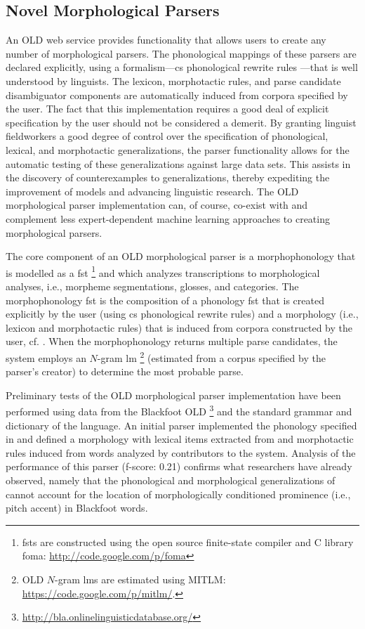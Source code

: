 \documentclass[11pt]{article}
\begin{document}
\subsection{Novel Morphological Parsers}
\label{sec:old-parsers}


An OLD web service provides functionality that allows users to create any
number of morphological parsers. The phonological mappings of these parsers
are declared explicitly, using a formalism---\gls{cs} phonological rewrite
rules \cite{chomsky68}---that is well understood by linguists. The lexicon,
morphotactic rules, and parse candidate disambiguator components are
automatically induced from corpora specified by the user. The fact that this
implementation requires a good deal of explicit specification by the user
should not be considered a demerit. By granting linguist fieldworkers a good
degree of control over the specification of phonological, lexical, and
morphotactic generalizations, the parser functionality allows for the automatic
testing of these generalizations against large data sets. This assists
in the discovery of counterexamples to generalizations, thereby expediting
the improvement of models and advancing linguistic research. The OLD
morphological parser implementation can, of course, co-exist with and
complement less expert-dependent machine learning approaches to creating
morphological parsers.

The core component of an OLD morphological parser is a morphophonology that is
modelled as a \gls{fst}%
\footnote{\glspl{fst} are constructed using the open source finite-state
compiler and C library foma: \url{http://code.google.com/p/foma}} %
and which analyzes transcriptions to morphological analyses, i.e., morpheme
segmentations, glosses, and categories. The morphophonology \gls{fst} is the
composition of a phonology \gls{fst} that is created explicitly by the user
(using \gls{cs} phonological rewrite rules) and a morphology (i.e., lexicon and
morphotactic rules) that is induced from corpora constructed by the user, cf. 
\cite{beesley2003finite,hulden2012}. When the morphophonology returns multiple
parse candidates, the system employs an $N$-gram \gls{lm}%
\footnote{OLD $N$-gram \glspl{lm} are estimated using MITLM:
\url{https://code.google.com/p/mitlm/}.} %
(estimated from a corpus specified by the parser's creator) to determine the
most probable parse.

Preliminary tests of the OLD morphological parser implementation have been
performed using data from the Blackfoot OLD%
\footnote{\url{http://bla.onlinelinguisticdatabase.org/}} %
and the standard grammar \cite{frantz91} and dictionary \cite{frantz95} of the
language. An initial parser implemented the phonology specified in
\cite{frantz91} and defined a morphology with lexical items extracted from
\cite{frantz95} and morphotactic rules induced from words analyzed by
contributors to the system. Analysis of the performance of this parser
(f-score: 0.21) confirms what researchers \cite{weber2013} have already
observed, namely that the phonological and morphological generalizations of
\cite{frantz91} cannot account for the location of morphologically conditioned
prominence (i.e., pitch accent) in Blackfoot words.
\end{document}
